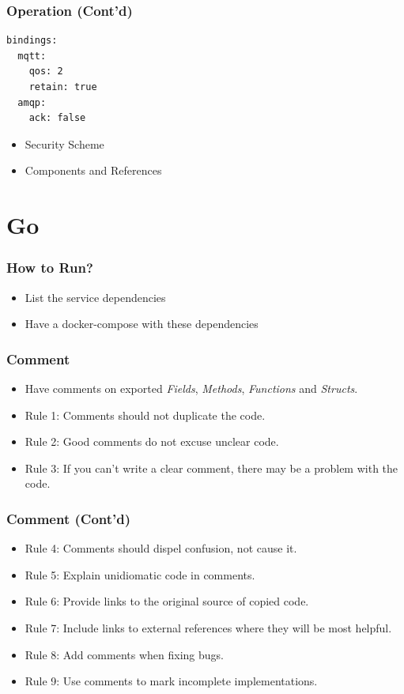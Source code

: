 \documentclass{efd-lecture}
\begin{document}
\begin{frame}[fragile]
  \frametitle{Operation (Cont'd)}
  \scriptsize
  \begin{verbatim}
bindings:
  mqtt:
    qos: 2
    retain: true
  amqp:
    ack: false
  \end{verbatim}
\end{frame}

\begin{frame}
  \begin{itemize}
    \item Security Scheme
    \item Components and References
  \end{itemize}
\end{frame}

\section{Go}

\begin{frame}
  \frametitle{How to Run?}
  \begin{itemize}
    \item List the service dependencies
    \item Have a docker-compose with these dependencies
  \end{itemize}
\end{frame}

\begin{frame}
  \frametitle{Comment}
  \begin{itemize}
    \item Have comments on exported \textit{\color{YellowOrange}Fields}, \textit{\color{LimeGreen}Methods},
      \textit{\color{Cyan}Functions} and \textit{\color{RubineRed}Structs}.
    \item Rule 1: Comments should not duplicate the code.
    \item Rule 2: Good comments do not excuse unclear code.
    \item Rule 3: If you can't write a clear comment, there may be a problem with the code.
  \end{itemize}
\end{frame}

\begin{frame}
  \frametitle{Comment (Cont'd)}
  \begin{itemize}
    \item Rule 4: Comments should dispel confusion, not cause it.
    \item Rule 5: Explain unidiomatic code in comments.
    \item Rule 6: Provide links to the original source of copied code.
    \item Rule 7: Include links to external references where they will be most helpful.
    \item Rule 8: Add comments when fixing bugs.
    \item Rule 9: Use comments to mark incomplete implementations.
  \end{itemize}
\end{frame}
\end{document}
